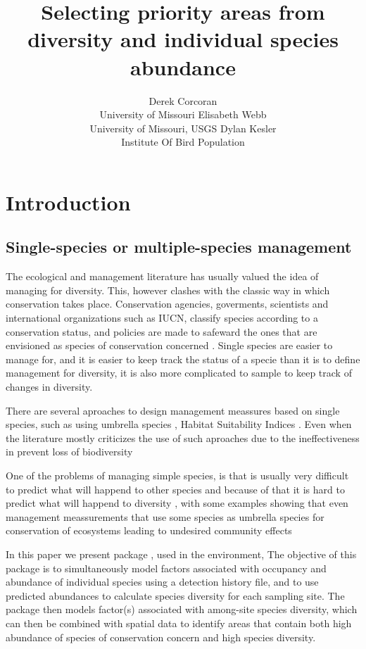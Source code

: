 \documentclass[article]{jss}
\author{
Derek Corcoran\\University of Missouri \And Elisabeth Webb\\University of Missouri, USGS \And Dylan Kesler\\Institute Of Bird Population
}
\title{Selecting priority areas from diversity and individual species abundance
\pkg{DiversityOccupancy}}
\begin{document}
\section{Introduction}\label{introduction}

\subsection{Single-species or multiple-species
management}\label{single-species-or-multiple-species-management}

The ecological and management literature has usually valued the idea of
managing for diversity. This, however clashes with the classic way in
which conservation takes place. Conservation agencies, goverments,
scientists and international organizations such as IUCN, classify
species according to a conservation status, and policies are made to
safeward the ones that are envisioned as species of conservation
concerned \citep{keller2004red, rodrigues2006value}. Single species are
easier to manage for, and it is easier to keep track the status of a
specie than it is to define management for diversity, it is also more
complicated to sample to keep track of changes in diversity.

There are several aproaches to design management meassures based on
single species, such as using umbrella species
\citep{crosby2015looking, bichet2016maintaining}, Habitat Suitability
Indices \citep{zohmann2013modelling}. Even when the literature mostly
criticizes the use of such aproaches due to the ineffectiveness in
prevent loss of biodiversity
\citep{roberge2004usefulness, branton2011assessing}

One of the problems of managing simple species, is that is usually very
difficult to predict what will happend to other species and because of
that it is hard to predict what will happend to diversity
\citep{pulliam2000relationship}, with some examples showing that even
management meassurements that use some species as umbrella species for
conservation of ecosystems leading to undesired community effects
\citep{white2013conservation}

In this paper we present package , used in the
 environment, The objective of this package is to
simultaneously model factors associated with occupancy and abundance of
individual species using a detection history file, and to use predicted
abundances to calculate species diversity for each sampling site. The
package then models factor(s) associated with among-site species
diversity, which can then be combined with spatial data to identify
areas that contain both high abundance of species of conservation
concern and high species diversity.
\end{document}
